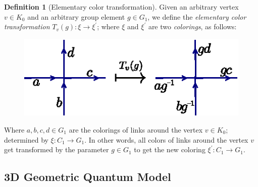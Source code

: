 \documentclass[a4paper,11pt]{article}
\theoremstyle{plain}%
\theoremstyle{definition}
\newtheorem{defn}[thm]{Definition}
\theoremstyle{remark}
\begin{document}
\begin{defn}[Elementary color transformation]\label{def:2d-coltrans}
Given an arbitrary vertex \(v \in K_0\) and an arbitrary group element \(g \in G_1\), we define the \emph{elementary color transformation} \(T_v(g): \xi \rightarrow \xi^\prime\); where \(\xi\) and \(\xi^\prime\) are two \emph{colorings}, as follows:
\begin{figure}[h!]
\centering
\includegraphics[scale=1]{2d-coltrans.eps}
\end{figure}

Where \(a,b,c,d \in G_1\) are the colorings of links around the vertex \(v \in K_0\); determined by \(\xi:C_1 \rightarrow G_1\). In other words, all colors of links around the vertex \(v\) get transformed by the parameter \(g \in G_1\) to get the new coloring \(\xi^\prime: C_1 \rightarrow G_1\).
\end{defn}

\subsection{3D Geometric Quantum Model }\label{sec:3Dmodel}
\end{document}
